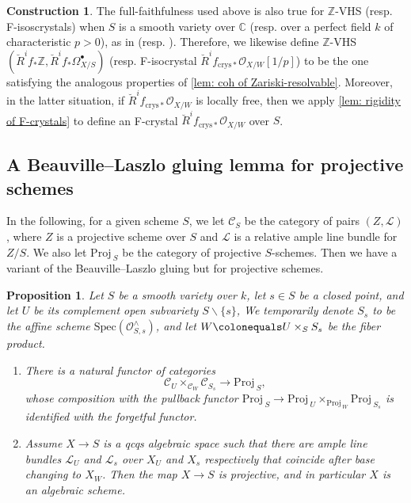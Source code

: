 \documentclass[11pt, letterpaper]{amsart}
\theoremstyle{plain}
\newtheorem{proposition}[theorem]{Proposition}
\theoremstyle{definition}
\newtheorem{construction}[theorem]{Construction}
\newcommand{\IC}{\mathbb{C}}
\newcommand{\IZ}{\mathbb{Z}}
\newcommand{\sC}{\mathcal{C}}
\newcommand{\Spec}{\mathrm{Spec}}
\newcommand{\<}{\langle}
\renewcommand{\>}{\rangle}
\newcommand{\Proj}{\mathrm{Proj\,}}
\newcommand{\sL}{\mathcal{L}}
\newcommand{\sO}{\mathcal{O}}
\newcommand{\crys}{\mathrm{crys}}
\begin{document}
\begin{construction}
\label{const: VHS and crystals resolved}
    The full-faithfulness used above is also true for $\IZ$-VHS (resp. F-isoscrystals) when $S$ is a smooth variety over $\IC$ (resp. over a perfect field $k$ of characteristic $p > 0$), as in \cite[Cor.~12]{Peters} (resp.  \cite[Thm.~2.2.3]{DK17}). 
    Therefore, we likewise define $\IZ$-VHS $(\breve{R}^i f_{*} \IZ, \breve{R}^i f_* \Omega^\bullet_{X/S})$ (resp. F-isocrystal $\breve{R}^i f_{\crys *} \sO_{X/W}[1/p]$) to be the one satisfying the analogous properties of \cref{lem: coh of Zariski-resolvable}. 
    Moreover, in the latter situation, if $\breve{R}^i f_{\crys *} \sO_{X/W}$ is locally free, then we apply \cref{lem: rigidity of F-crystals} to define an F-crystal $\breve{R}^i f_{\crys *} \sO_{X/W}$ over $S$. 
\end{construction}


\subsection{A Beauville--Laszlo gluing lemma for projective schemes}

In the following, for a given scheme $S$, we let $\sC_S$ be the category of pairs $(Z,\sL)$, where $Z$ is a projective scheme over $S$ and $\sL$ is a relative ample line bundle for $Z/S$.
We also let $\Proj_S$ be the category of projective $S$-schemes.
Then we have a variant of the Beauville--Laszlo gluing but for projective schemes.
\begin{proposition}
	\label{BL gluing}
	Let $S$ be a smooth variety over $k$, let $s\in S$ be a closed point, and let $U$ be its complement open subvariety $S\backslash \{s\}$,
	We temporarily denote $S_s$ to be the affine scheme $\Spec(\sO^\wedge_{S,s})$, and let $W\colonequals U\times_S S_s$ be the fiber product.
	\begin{enumerate}[label=\upshape{(\roman*)},leftmargin=*]
		\item There is a natural functor of categories 
		\[
		\sC_U \times_{\sC_W} \sC_{S_s} \longrightarrow  \Proj_S,
		\]
		whose composition with the pullback functor $\Proj_S \to \Proj_U\times_{\Proj_W} \Proj_{S_s}$ is identified with the forgetful functor.
		\item Assume $X\to S$ is a qcqs algebraic space such that there are ample line bundles $\sL_U$ and $\sL_s$ over $X_U$ and $X_s$ respectively that coincide after base changing to $X_W$.
		Then the map $X\to S$ is projective, and in particular $X$ is an algebraic scheme.
	\end{enumerate}
\end{proposition}
\end{document}
